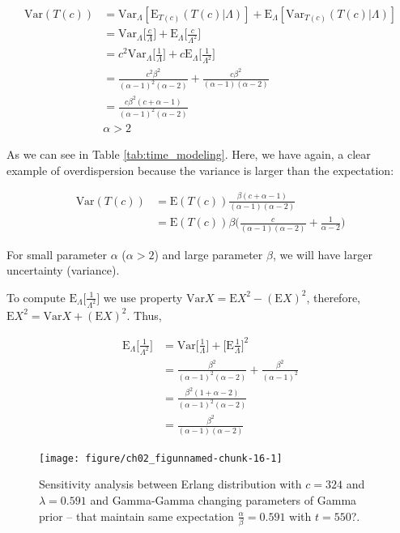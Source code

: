 \begin{align*}
\textrm{Var}(T(c)) &= \textrm{Var}_{\Lambda}[\textrm{E}_{T(c)} (T(c)|\Lambda)] + \textrm{E}_{\Lambda}[\textrm{Var}_{T(c)}(T(c)|\Lambda)]\\
&=\textrm{Var}_{\Lambda}\Bigg [\frac{c}{\Lambda}\Bigg ] + \textrm{E}_{\Lambda}\Bigg [\frac{c}{\Lambda^2}\Bigg ] \\
&=c^2\textrm{Var}_{\Lambda}\Bigg [\frac{1}{\Lambda}\Bigg ] + c\textrm{E}_{\Lambda}\Bigg [\frac{1}{\Lambda^2}\Bigg ] \\
&=\frac{c^2\beta^2}{(\alpha-1)^2(\alpha-2)} + \frac{c\beta^2}{(\alpha-1)(\alpha-2)}\\
&=\frac{c\beta^2(c+\alpha-1)}{(\alpha-1)^2(\alpha-2)}\\
&\alpha>2
\end{align*}

As we can see in Table \ref{tab:time_modeling}. Here, we have again, a clear example of overdispersion because the variance is larger than the expectation:

\begin{align*}
\textrm{Var}(T(c))&=\textrm{E}(T(c))\frac{\beta(c+\alpha-1)}{(\alpha-1)(\alpha-2)}\\
&=\textrm{E}(T(c))\beta\Bigg(\frac{c}{(\alpha-1)(\alpha-2)}+\frac{1}{\alpha-2}\Bigg)
\end{align*}

For small parameter $\alpha$ ($\alpha>2$) and large parameter $\beta$, we will have larger uncertainty (variance).

To compute $\textrm{E}_{\Lambda}\Bigg [\frac{1}{\Lambda^2}\Bigg ]$ we use property $\textrm{Var}X = \textrm{E}X^2-(\textrm{E}X)^2$, therefore, $\textrm{E}X^2 = \textrm{Var}X + (\textrm{E}X)^2$. Thus,

\begin{align*}
\textrm{E}_{\Lambda}\Bigg [\frac{1}{\Lambda^2}\Bigg ] &= \textrm{Var}\Bigg [\frac{1}{\Lambda}\Bigg ] + \Bigg [\textrm{E}\frac{1}{\Lambda}\Bigg ]^2\\
&=\frac{\beta^2}{(\alpha-1)^2(\alpha-2)} + \frac{\beta^2}{(\alpha-1)^2}\\
&=\frac{\beta^2(1+\alpha-2)}{(\alpha-1)^2(\alpha-2)}\\
&=\frac{\beta^2}{(\alpha-1)(\alpha-2)}
\end{align*}

\begin{figure}
\begin{knitrout}
\color{fgcolor}

{\centering \texttt{[image: figure/ch02\_figunnamed-chunk-16-1]} 

}


\end{knitrout}
	\caption{Sensitivity analysis between Erlang distribution with $c = 324$ and $\lambda = 0.591$ and Gamma-Gamma changing parameters of Gamma prior -- that maintain same expectation $\frac{\alpha}{\beta} = 0.591$ with $t=550$?.}
  \label{fig:2_6a}
\end{figure}



